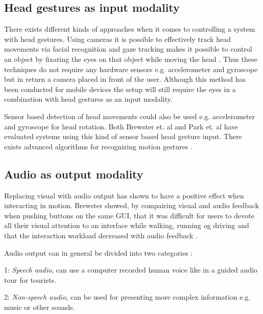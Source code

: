 \subsection{Head gestures as input modality}

There exists different kinds of approaches when it comes to controlling a system with head gestures. Using cameras it is possible to effectively track head movements via facial recognition \cite{morimoto_recognition_1996} and gaze tracking makes it possible to control an object by fixating the eyes on that object while moving the head \cite{vspakov_enhanced_2012}. Thus these techniques do not require any hardware sensors e.g. accelerometer and gyroscope but in return a camera placed in front of the user. Although this method has been conducted for mobile devices \cite{mardanbegi_eye-based_2012} the setup will still require the eyes in a combination with head gestures as an input modality.

Sensor based detection of head movements could also be used e.g. accelerometer and gyroscope for head rotation. Both Brewster et. al \cite{brewster_multimodaleyes-freeinteraction_2003} and Park et. al \cite{park_gaze-directed_2011} have evaluated systems using this kind of sensor based head gesture input. There exists advanced algorithms for recognizing motion gestures \cite{lu_head_2005, kratz_combining_2013, akl_accelerometer-based_2010}.

\subsection{Audio as output modality}
\label{sec:audiomodality}
Replacing visual with audio output has shown to have a positive effect when interacting in motion. Brewster showed, by compairing visual and audio feedback when pushing buttons on the same GUI, that it was difficult for users to devote all their visual attention to an interface while walking, running og driving and that the interaction workload decreased with audio feedback \cite{brewster_overcoming_2002}.

Audio output can in general be divided into two categories \cite{rocchesso_sounding_2003}:
\begin{description}
\item{1: \textit{Speech audio}}, can use a computer recorded human voice like in a guided audio tour for tourists.
\item{2: \textit{Non-speech audio}}, can be used for presenting more complex information e.g. music or other sounds.
\end{description}

